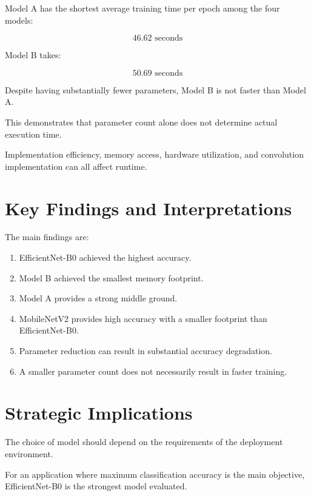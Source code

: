 \documentclass[12pt,a4paper]{report}
\begin{document}
Model A has the shortest average training time per epoch among
the four models:

\[
46.62\text{ seconds}
\]

Model B takes:

\[
50.69\text{ seconds}
\]

Despite having substantially fewer parameters, Model B is not
faster than Model A.

This demonstrates that parameter count alone does not determine
actual execution time.

Implementation efficiency, memory access, hardware utilization,
and convolution implementation can all affect runtime.

\section{Key Findings and Interpretations}

The main findings are:

\begin{enumerate}
    \item EfficientNet-B0 achieved the highest accuracy.
    \item Model B achieved the smallest memory footprint.
    \item Model A provides a strong middle ground.
    \item MobileNetV2 provides high accuracy with a smaller
    footprint than EfficientNet-B0.
    \item Parameter reduction can result in substantial accuracy
    degradation.
    \item A smaller parameter count does not necessarily result
    in faster training.
\end{enumerate}

\section{Strategic Implications}

The choice of model should depend on the requirements of the
deployment environment.

For an application where maximum classification accuracy is the
main objective, EfficientNet-B0 is the strongest model evaluated.
\end{document}

